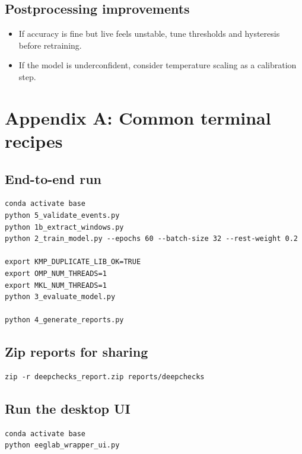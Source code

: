 \documentclass[11pt]{article}
\begin{document}
\subsection{Postprocessing improvements}
\begin{itemize}[leftmargin=*]
\item If accuracy is fine but live feels unstable, tune thresholds and hysteresis before retraining.
\item If the model is underconfident, consider temperature scaling as a calibration step.
\end{itemize}

\section{Appendix A: Common terminal recipes}
\subsection{End-to-end run}
\begin{lstlisting}
conda activate base
python 5_validate_events.py
python 1b_extract_windows.py
python 2_train_model.py --epochs 60 --batch-size 32 --rest-weight 0.2

export KMP_DUPLICATE_LIB_OK=TRUE
export OMP_NUM_THREADS=1
export MKL_NUM_THREADS=1
python 3_evaluate_model.py

python 4_generate_reports.py
\end{lstlisting}

\subsection{Zip reports for sharing}
\begin{lstlisting}
zip -r deepchecks_report.zip reports/deepchecks
\end{lstlisting}

\subsection{Run the desktop UI}
\begin{lstlisting}
conda activate base
python eeglab_wrapper_ui.py
\end{lstlisting}
\end{document}

